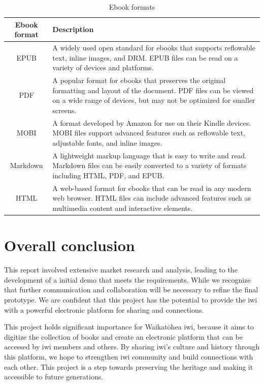 \begin{table}[h]
  \centering
  \caption{Ebook formats}
  \begin{tabular}{|c|p{10cm}|}
  \hline
  \textbf{Ebook format} & \textbf{Description} \\
  \hline
  EPUB & A widely used open standard for ebooks that supports reflowable text, inline images, and DRM. EPUB files can be read on a variety of devices and platforms. \\
  \hline
  PDF & A popular format for ebooks that preserves the original formatting and layout of the document. PDF files can be viewed on a wide range of devices, but may not be optimized for smaller screens. \\
  \hline
  MOBI & A format developed by Amazon for use on their Kindle devices. MOBI files support advanced features such as reflowable text, adjustable fonts, and inline images. \\
  \hline
  Markdown & A lightweight markup language that is easy to write and read. Markdown files can be easily converted to a variety of formats including HTML, PDF, and EPUB. \\
  \hline
  HTML & A web-based format for ebooks that can be read in any modern web browser. HTML files can include advanced features such as multimedia content and interactive elements. \\
  \hline
  \end{tabular}
  \label{fig32}
  \end{table}
  

\section{Overall conclusion} 

This report involved extensive market research and analysis, leading to the development of a initial demo that meets the requirements. 
While we recognize that further communication and collaboration will be necessary to refine the final prototype.
We are confident that this project has the potential to provide the iwi with a powerful electronic platform for sharing and connections. 

This project holds significant importance for Waikatōhea iwi, because it aims to digitize the collection of books and create an electronic platform that can be accessed by iwi members and others. 
By sharing iwi's culture and history through this platform, we hope to strengthen iwi community and build connections with each other. 
This project is a step towards preserving the heritage and making it accessible to future generations.



